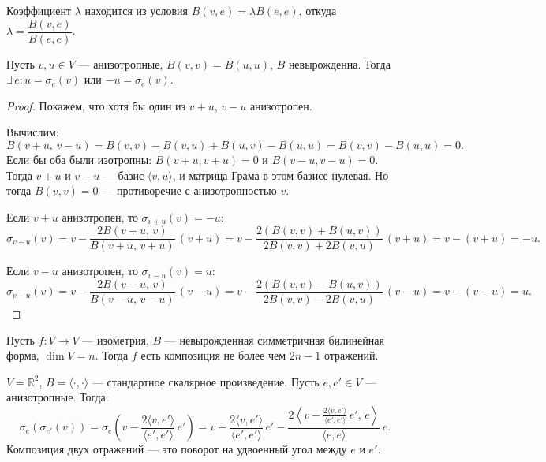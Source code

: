 \begin{remark}
    Коэффициент $\lambda$ находится из условия $B(v, e) = \lambda B(e, e)$, откуда $\lambda = \dfrac{B(v, e)}{B(e, e)}$.
\end{remark}


\begin{lemma}
    Пусть $v, u \in V$ --- анизотропные, $B(v, v) = B(u, u)$, $B$ невырожденна. Тогда $\exists\, e\colon u = \sigma_e(v)$ или
    $-u = \sigma_e(v)$.

    \begin{proof}
        Покажем, что хотя бы один из $v + u$, $v - u$ анизотропен.

        Вычислим:
        \[
            B(v + u,\, v - u) = B(v, v) - B(v, u) + B(u, v) - B(u, u) = B(v,v) - B(u,u) = 0.
        \]
        Если бы оба были изотропны: $B(v+u, v+u) = 0$ и $B(v-u, v-u) = 0$.
        Тогда $v+u$ и $v-u$ --- базис $\langle v, u \rangle$, и матрица Грама в этом базисе нулевая. Но тогда
        $B(v, v) = 0$ --- противоречие с анизотропностью $v$.

        Если $v + u$ анизотропен, то $\sigma_{v+u}(v) = -u$:
        \[
            \sigma_{v+u}(v) = v - \frac{2B(v+u,\, v)}{B(v+u,\, v+u)}\,(v+u) =
            v - \frac{2(B(v,v) + B(u,v))}{2B(v,v) + 2B(v,u)}\,(v+u) = v - (v+u) = -u.
        \]

        Если $v - u$ анизотропен, то $\sigma_{v-u}(v) = u$:
        \[
            \sigma_{v-u}(v) = v - \frac{2B(v-u,\, v)}{B(v-u,\, v-u)}\,(v-u) =
            v - \frac{2(B(v,v) - B(u,v))}{2B(v,v) - 2B(v,u)}\,(v-u) = v - (v-u) = u.
        \]
    \end{proof}
\end{lemma}


\begin{theorem}
    Пусть $f\colon V \to V$ --- изометрия, $B$ --- невырожденная симметричная билинейная форма,
    $\dim V = n$. Тогда $f$ есть композиция не более чем $2n - 1$ отражений.

    \begin{example}
    $V = \mathbb{R}^2$, $B = \langle \cdot, \cdot \rangle$ --- стандартное скалярное произведение.
    Пусть $e, e' \in V$ --- анизотропные. Тогда:
    \[
        \sigma_e(\sigma_{e'}(v)) = \sigma_e\!\left(v - \frac{2\langle v, e' \rangle}{\langle e', e' \rangle}
        \, e'\right) =
        v - \frac{2\langle v, e' \rangle}{\langle e', e' \rangle}\, e' -
        \frac{2\left\langle v - \frac{2\langle v, e' \rangle}{\langle e', e' \rangle}\, e',\, e\right\rangle}
        {\langle e, e \rangle}\, e.
    \]
    Композиция двух отражений --- это поворот на удвоенный угол между $e$ и $e'$.
\end{example}

\end{theorem}


